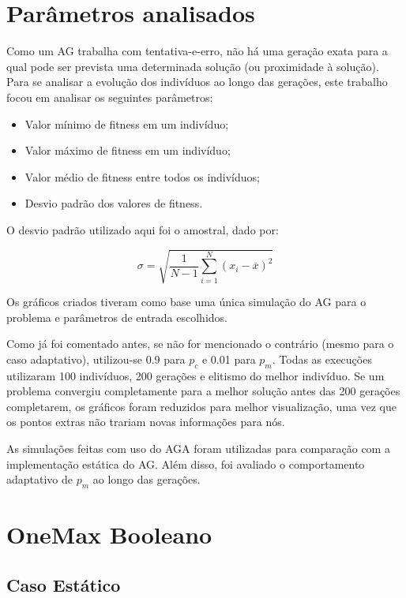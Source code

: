 \label{5_resultados}

\section{Parâmetros analisados}

Como um AG trabalha com tentativa-e-erro, não há uma geração exata para a qual pode ser prevista uma determinada solução (ou proximidade à solução). Para se analisar a evolução dos indivíduos ao longo das gerações, este trabalho focou em analisar os seguintes parâmetros:

\begin{itemize}
	\item Valor mínimo de fitness em um indivíduo;
	\item Valor máximo de fitness em um indivíduo;
	\item Valor médio de fitness entre todos os indivíduos;
	\item Desvio padrão dos valores de fitness.
\end{itemize}

O desvio padrão utilizado aqui foi o amostral, dado por:

\begin{equation}
	\sigma = \sqrt{\frac{1}{N-1} \sum_{i=1}^N (x_i - \overline{x})^2}
\end{equation}

Os gráficos criados tiveram como base uma única simulação do AG para o problema e parâmetros de entrada escolhidos.

Como já foi comentado antes, se não for mencionado o contrário (mesmo para o caso adaptativo), utilizou-se 0.9 para $p_c$ e 0.01 para $p_m$. Todas as execuções utilizaram 100 indivíduos, 200 gerações e elitismo do melhor indivíduo. Se um problema convergiu completamente para a melhor solução antes das 200 gerações completarem, os gráficos foram reduzidos para melhor visualização, uma vez que os pontos extras não trariam novas informações para nós.

As simulações feitas com uso do AGA foram utilizadas para comparação com a implementação estática do AG. Além disso, foi avaliado o comportamento adaptativo de $p_m$ ao longo das gerações.

\section{OneMax Booleano}

\subsection{Caso Estático}

